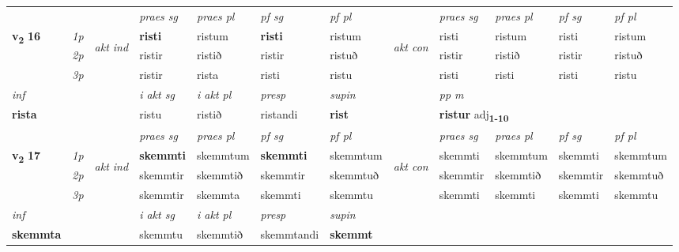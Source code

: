 \begin{longtable}[l]{X>{\footnotesize\itshape}llXXXXlXXXX}
 & &   & \textit{praes sg}  & \textit{praes pl}    & \textit{ pf sg} & \textit{pf pl} & & \textit{praes sg}  & \textit{praes pl}    & \textit{pf sg} & \textit{pf pl }  \\ \cmidrule{4-7} \cmidrule{9-12}
 \multirow{2}{*}{{{\textbf{v{\textsubscript{2}}} \Large{\textbf{16}}}}}  & 1p & \multirow{3}{*}{\begin{turn}{90}\textit{akt ind}\end{turn}} & \textbf{risti} & ristum & \textbf{risti} & ristum & \multirow{3}{*}{\begin{turn}{90}\textit{akt con}\end{turn}} &risti & ristum & risti & ristum\\*
 & 2p &  &  ristir  & ristið & ristir & ristuð & & ristir & ristið & ristir & ristuð \\*
 & 3p &  & ristir & rista & risti & ristu & & risti & risti& risti & ristu \\*
\cmidrule{4-7} \cmidrule{9-12}

   {\textit{inf}} & &  & \textit{i akt sg} & \textit{i akt pl}   & \textit{presp} & \textit{supin}  && \textit{pp m} \\*
  {\textbf{rista}} & && ristu  & ristið   & ristandi &  \textbf{rist}  && \multicolumn{2}{l}{\textbf{ristur} adj\textbf{\textsubscript{1-10}}} \\*

\midrule

 & &   & \textit{praes sg}  & \textit{praes pl}    & \textit{ pf sg} & \textit{pf pl} & & \textit{praes sg}  & \textit{praes pl}    & \textit{pf sg} & \textit{pf pl }  \\ \cmidrule{4-7} \cmidrule{9-12}
 \multirow{2}{*}{{{\textbf{v{\textsubscript{2}}} \Large{\textbf{17}}}}}  & 1p & \multirow{3}{*}{\begin{turn}{90}\textit{akt ind}\end{turn}} & \textbf{skemmti} & skemmtum & \textbf{skemmti} & skemmtum & \multirow{3}{*}{\begin{turn}{90}\textit{akt con}\end{turn}} &skemmti & skemmtum & skemmti & skemmtum\\*
 & 2p &  &  skemmtir  & skemmtið & skemmtir & skemmtuð & & skemmtir & skemmtið & skemmtir & skemmtuð \\*
 & 3p &  & skemmtir & skemmta & skemmti & skemmtu & & skemmti & skemmti& skemmti & skemmtu \\*
\cmidrule{4-7} \cmidrule{9-12}

   {\textit{inf}} & &  & \textit{i akt sg} & \textit{i akt pl}   & \textit{presp} & \textit{supin}   \\*
  {\textbf{skemmta}} & && skemmtu  & skemmtið   & skemmtandi &  \textbf{skemmt}   \\*


\end{longtable}
